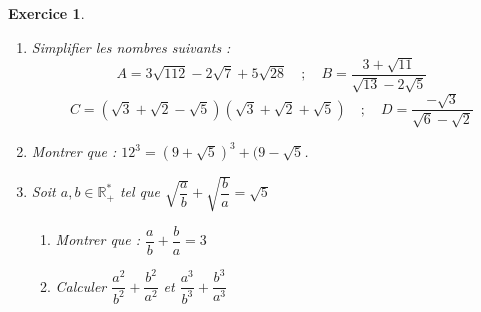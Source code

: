 \documentclass[12pt,a4paper]{article}
\theoremstyle{mystyle}
\newtheorem{exo}{Exercice}
\begin{document}
\begin{multicols*}{2}
\begin{exo}
	\text{ }
	\begin{enumerate}
		\item Simplifier les nombres suivants :
		$$A = 3\sqrt{112} - 2\sqrt{7} + 5\sqrt{28}\quad;\quad B = \dfrac{3 + \sqrt{11}}{\sqrt{13} - 2\sqrt{5}} $$
		$$C = (\sqrt{3} + \sqrt{2} - \sqrt{5})(\sqrt{3} + \sqrt{2} + \sqrt{5}) \quad;\quad D = \dfrac{-\sqrt{3}}{\sqrt{6} - \sqrt{2}}$$
		\item Montrer que : $12^3 = (9+\sqrt{5})^3 + (9 - \sqrt{5}$.
		\item Soit $a,b\in\mathbb{R}^*_+$ tel que $\sqrt{\dfrac{a}{b}} + \sqrt{\dfrac{b}{a}} = \sqrt{5}$
		\begin{enumerate}
			\item Montrer que : $\dfrac{a}{b} + \dfrac{b}{a} = 3$
			\item Calculer $\dfrac{a^2}{b^2} + \dfrac{b^2}{a^2}$ et $\dfrac{a^3}{b^3} + \dfrac{b^3}{a^3}$
		\end{enumerate}
	\end{enumerate}
\end{exo}



	



























\end{multicols*}
\end{document}

